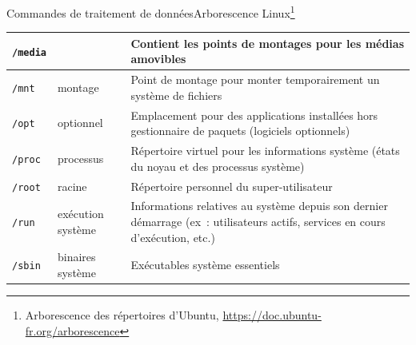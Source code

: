 \documentclass{beamer}
\begin{document}
\begin{frame}{Commandes de traitement de données}{Arborescence Linux\footnote{\label{arborescence-linux}Arborescence des répertoires d’Ubuntu, \url{https://doc.ubuntu-fr.org/arborescence}}}
\begin{tiny}
\begin{table}[h!]
\begin{tabular}{|l|p{3cm}|p{6cm}|}
                    \hline
                    \lstinline{/media}  &                                      & Contient les points de montages pour les médias amovibles                                                                      \\
                    \hline
                    \lstinline{/mnt}    & montage                              & Point de montage pour monter temporairement un système de fichiers                                                             \\
                    \hline
                    \lstinline{/opt}    & optionnel                            & Emplacement pour des applications installées hors gestionnaire de paquets (logiciels optionnels)                               \\
                    \hline
                    \lstinline{/proc}   & processus                            & Répertoire virtuel pour les informations système (états du noyau et des processus système)                                     \\
                    \hline
                    \lstinline{/root}   & racine                               & Répertoire personnel du super-utilisateur                                                                                      \\
                    \hline
                    \lstinline{/run}    & exécution système                    & Informations relatives au système depuis son dernier démarrage (ex~: utilisateurs actifs, services en cours d'exécution, etc.) \\
                    \hline
                    \lstinline{/sbin}   & binaires système                     & Exécutables système essentiels                                                                                                 \\
                    \hline
                \end{tabular}
            \end{table}
        \end{tiny}
    \end{frame}
\end{document}
